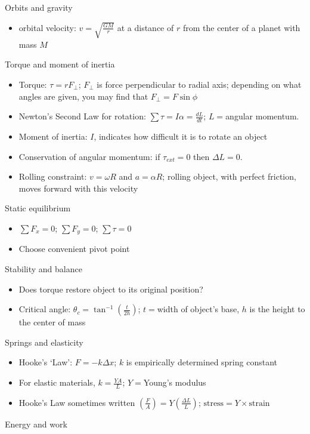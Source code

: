 \documentclass[11pt,letterpaper]{article}
\begin{document}
Orbits and gravity
\begin{itemize}
\item orbital velocity: $v=\displaystyle\sqrt{\displaystyle\frac{GM}{r}}$ at a distance of $r$ from the center of a planet with mass $M$
\end{itemize}
Torque and moment of inertia
\begin{itemize}
\item Torque: $\tau=rF_\perp$; $F_\perp$ is force perpendicular to radial axis; depending on what angles are given, you may find that $F_\perp=F\sin\phi$
\item Newton's Second Law for rotation: $\sum\tau=I\alpha=\displaystyle\frac{dL}{dt}$; $L=$angular momentum.
\item Moment of inertia: $I$, indicates how difficult it is to rotate an object
\item Conservation of angular momentum: if $\tau_{ext}=0$ then $\Delta{L}=0$.
\item Rolling constraint: $v=\omega{R}$ and $a=\alpha{R}$; rolling object, with perfect friction, moves forward with this velocity
\end{itemize}
Static equilibrium
\begin{itemize}
\item $\sum{F_x}=0$; $\sum{F_y}=0$; $\sum\tau=0$
\item Choose convenient pivot point
\end{itemize}
Stability and balance
\begin{itemize}
\item Does torque restore object to its original position?
\item Critical angle: $\theta_c=\tan^{-1}\left(\displaystyle\frac{t}{2h}\right)$; $t=$width of object's base, $h$ is the height to the center of mass
\end{itemize}
Springs and elasticity
\begin{itemize}
\item Hooke's `Law': $F=-k\Delta{x}$; $k$ is empirically determined spring constant
\item For elastic materials, $k=\displaystyle\frac{YA}{L}$; $Y=$Young's modulus
\item Hooke's Law sometimes written $\displaystyle\left(\frac{F}{A}\right)=Y\left(\displaystyle\frac{\Delta{L}}{L}\right)$; $\mbox{stress}=Y\times\mbox{strain}$
\end{itemize}
Energy and work
\end{document}

